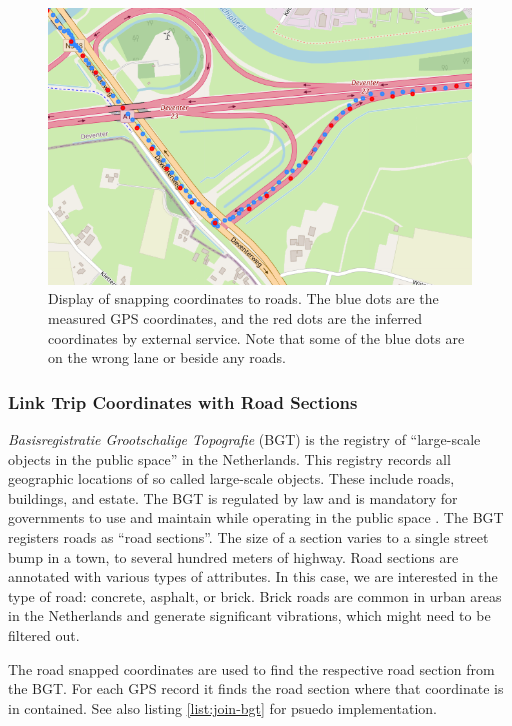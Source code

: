 \begin{figure}[H]
\begin{center}
\includegraphics[width=.85\textwidth,keepaspectratio]{images/4_data/snap-trips.png}
\end{center}
\captionsetup{width=.90\textwidth}
\caption{Display of snapping coordinates to roads. The blue dots are the measured GPS coordinates, and the red dots are the inferred coordinates by external service. Note that some of the blue dots are on the wrong lane or beside any roads.}
\label{fig:snap-trips}
\end{figure}


\subsubsection{Link Trip Coordinates with Road Sections}
\textit{Basisregistratie Grootschalige Topografie} (BGT) is the registry of ``large-scale objects in the public space'' in the Netherlands. This registry records all geographic locations of so called large-scale objects. These include roads, buildings, and estate. The BGT is regulated by law and is mandatory for governments to use and maintain while operating in the public space \cite{BGT}. The BGT registers roads as ``road sections''. The size of a section varies to a single street bump in a town, to several hundred meters of highway. Road sections are annotated with various types of attributes. In this case, we are interested in the type of road: concrete, asphalt, or brick. Brick roads are common in urban areas in the Netherlands and generate significant vibrations, which might need to be filtered out. 

The road snapped coordinates are used to find the respective road section from the BGT. For each GPS record it finds the road section where that coordinate is in contained. See also listing \ref{list:join-bgt} for psuedo implementation.



